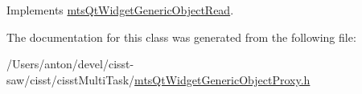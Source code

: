 Implements \hyperlink{classmts_qt_widget_generic_object_read_ade3ec733d27e14609b2f95831a389658}{mts\+Qt\+Widget\+Generic\+Object\+Read}.



The documentation for this class was generated from the following file\+:\begin{DoxyCompactItemize}
\item 
/\+Users/anton/devel/cisst-\/saw/cisst/cisst\+Multi\+Task/\hyperlink{mts_qt_widget_generic_object_proxy_8h}{mts\+Qt\+Widget\+Generic\+Object\+Proxy.\+h}\end{DoxyCompactItemize}
